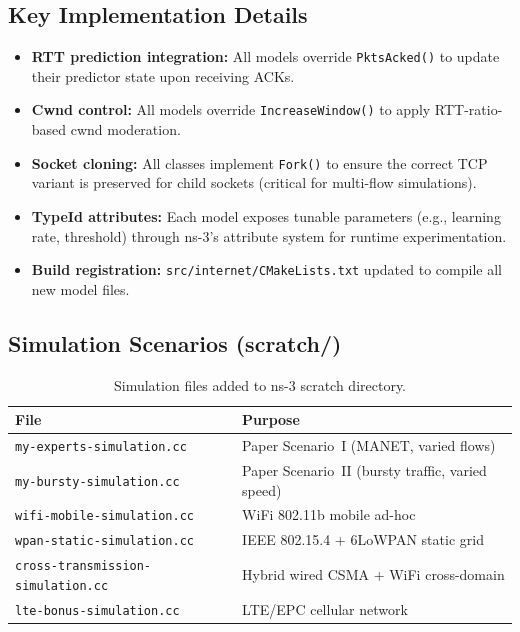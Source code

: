 \documentclass[12pt,a4paper]{article}
\begin{document}
\subsection{Key Implementation Details}
\begin{itemize}
    \item \textbf{RTT prediction integration:} All models override \texttt{PktsAcked()} to update their predictor state upon receiving ACKs.
    \item \textbf{Cwnd control:} All models override \texttt{IncreaseWindow()} to apply RTT-ratio-based cwnd moderation.
    \item \textbf{Socket cloning:} All classes implement \texttt{Fork()} to ensure the correct TCP variant is preserved for child sockets (critical for multi-flow simulations).
    \item \textbf{TypeId attributes:} Each model exposes tunable parameters (e.g., learning rate, threshold) through ns-3's attribute system for runtime experimentation.
    \item \textbf{Build registration:} \texttt{src/internet/CMakeLists.txt} updated to compile all new model files.
\end{itemize}

\subsection{Simulation Scenarios (scratch/)}

\begin{table}[H]
\centering
\caption{Simulation files added to ns-3 scratch directory.}
\label{tab:sim_files}
\small
\begin{tabularx}{\textwidth}{l X}
\toprule
\textbf{File} & \textbf{Purpose} \\
\midrule
\texttt{my-experts-simulation.cc} & Paper Scenario~I (MANET, varied flows) \\
\texttt{my-bursty-simulation.cc} & Paper Scenario~II (bursty traffic, varied speed) \\
\texttt{wifi-mobile-simulation.cc} & WiFi 802.11b mobile ad-hoc \\
\texttt{wpan-static-simulation.cc} & IEEE 802.15.4 + 6LoWPAN static grid \\
\texttt{cross-transmission-simulation.cc} & Hybrid wired CSMA + WiFi cross-domain \\
\texttt{lte-bonus-simulation.cc} & LTE/EPC cellular network \\
\bottomrule
\end{tabularx}
\end{table}
\end{document}
